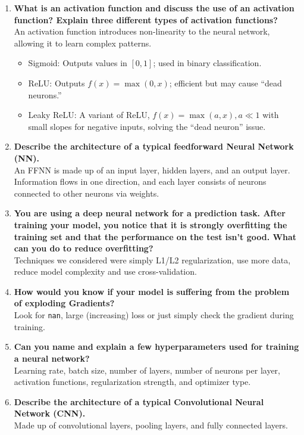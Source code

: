 \documentclass[a4paper,12pt]{article}
\begin{document}
	\begin{enumerate}
		\item \textbf{What is an activation function and discuss the use of an activation function? Explain three different types of activation functions?} \\
		An activation function introduces non-linearity to the neural network, allowing it to learn complex patterns.
		\begin{itemize}
			\item Sigmoid: Outputs values in $[0,1]$; used in binary classification.
			\item ReLU: Outputs $f(x)=\max(0,x)$; efficient but may cause ``dead neurons.''
			\item Leaky ReLU: A variant of ReLU, $f(x)=\max(a,x), a\ll1$ with small slopes for negative inputs, solving the ``dead neuron'' issue.
		\end{itemize}
		
		\item \textbf{Describe the architecture of a typical feedforward Neural Network (NN).} \\
		An FFNN is made up of an input layer, hidden layers, and an output layer. Information flows in one direction, and each layer consists of neurons connected to other neurons via weights.
		
		\item \textbf{You are using a deep neural network for a prediction task. After training your model, you notice that it is strongly overfitting the training set and that the performance on the test isn't good. What can you do to reduce overfitting?} \\
		Techniques we considered were simply L1/L2 regularization, use more data, reduce model complexity and use cross-validation.
		
		\item \textbf{How would you know if your model is suffering from the problem of exploding Gradients?} \\
		Look for \texttt{nan}, large (increasing) loss or just simply check the gradient during training.
		
		\item \textbf{Can you name and explain a few hyperparameters used for training a neural network?} \\
		Learning rate, batch size, number of layers, number of neurons per layer, activation functions, regularization strength, and optimizer type.
		
		\item \textbf{Describe the architecture of a typical Convolutional Neural Network (CNN).} \\
		Made up of convolutional layers, pooling layers, and fully connected layers.
		

\end{enumerate}
\end{document}
